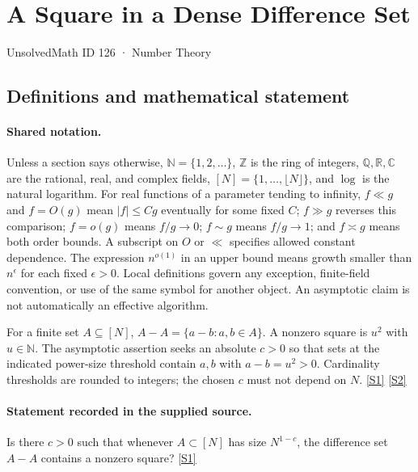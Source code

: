 \documentclass[11pt,a4paper]{article}
\newcommand{\N}{\mathbb{N}}
\newcommand{\Z}{\mathbb{Z}}
\newcommand{\Q}{\mathbb{Q}}
\newcommand{\R}{\mathbb{R}}
\newcommand{\C}{\mathbb{C}}
\newcommand{\sref}[2]{\hyperlink{source:#1:#2}{[S#2]}}
\begin{document}

\setcounter{section}{125}

\section{A Square in a Dense Difference Set}\label{126}

{\small\sffamily UnsolvedMath ID 126 · Number Theory}

\subsection{Definitions and mathematical statement}

\paragraph{Shared notation.}Unless a section says otherwise, $\N=\{1,2,\ldots\}$,
$\Z$ is the ring of integers, $\Q,\R,\C$ are the rational, real, and complex
fields, $[N]=\{1,\ldots,\lfloor N\rfloor\}$, and $\log$ is the natural
logarithm. For real functions of a parameter tending to infinity,
$f\ll g$ and $f=O(g)$ mean $|f|\leq Cg$ eventually for some fixed $C$;
$f\gg g$ reverses this comparison; $f=o(g)$ means $f/g\to0$;
$f\sim g$ means $f/g\to1$; and $f\asymp g$ means both order bounds.
A subscript on $O$ or $\ll$ specifies allowed constant dependence.
The expression $n^{o(1)}$ in an upper bound means growth smaller than
$n^\epsilon$ for each fixed $\epsilon>0$. Local definitions govern any
exception, finite-field convention, or use of the same symbol for another
object. An asymptotic claim is not automatically an effective algorithm.



For a finite set $A\subseteq[N]$, $A-A=\{a-b:a,b\in A\}$. A nonzero square is $u^2$ with $u\in\N$. The asymptotic assertion seeks an absolute $c>0$ so that sets at the indicated power-size threshold contain $a,b$ with $a-b=u^2>0$. Cardinality thresholds are rounded to integers; the chosen $c$ must not depend on $N$. \sref{126}{1} \sref{126}{2}

\paragraph{Statement recorded in the supplied source.}
Is there $c > 0$ such that whenever $A \subset [N]$ has size $N^{1-c}$, the difference set $A - A$ contains a nonzero square? \sref{126}{1}
\end{document}
